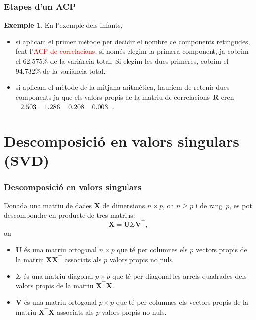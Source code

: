 \documentclass[12pt,t]{beamer}
\newcommand{\red}[1]{\textcolor{red}{#1}}
\renewcommand{\geq}{\geqslant}
\theoremstyle{plain}
\theoremstyle{definition}
\newtheorem{exemple}{Exemple}
\begin{document}
\begin{frame}
\frametitle{Etapes d'un ACP}
\begin{exemple}
En l'exemple dels infants,
\begin{itemize}
\item si aplicam el primer mètode per decidir el nombre de components retingudes, fent l'\red{ACP de correlacions}, si només elegim la primera component, ja cobrim el $62.575\%$ de la variància total. Si elegim les dues primeres, cobrim el $94.732\%$ de la variància total.
\item si aplicam el mètode de la mitjana aritmètica, hauríem de retenir dues components ja que  els valors propis de la matriu de correlacions~$\mathbf{R}$ eren 
$
\begin{tabular}{rrrr}
  2.503 & 1.286 & 0.208 & 0.003 \\ 
  \end{tabular}$.
\end{itemize}
\end{exemple}
\end{frame}


\section{Descomposició en valors singulars (SVD)}
\begin{frame}
\frametitle{Descomposició en valors singulars}
Donada una matriu de dades $\mathbf{X}$ de dimensions $n\times p$, on $n\geq p$ i de rang~$p$, es pot descompondre en producte de tres matrius:
\[
\mathbf{X}=\mathbf{U}\Sigma\mathbf{V}^\top,
\]
on
\begin{itemize}
\item $\mathbf{U}$ és una matriu ortogonal $n\times p$ que té per columnes els $p$ vectors propis de la matriu $\mathbf{X}\mathbf{X}^\top$ associats als $p$ valors propis no nuls.
\item ${\Sigma}$ és una matriu diagonal $p\times p$ que té per diagonal les arrels quadrades dels valors propis de la matriu $\mathbf{X}^\top\mathbf{X}$.
\item $\mathbf{V}$ és una matriu ortogonal $p\times p$ que té per columnes els vectors propis de la matriu $\mathbf{X}^\top\mathbf{X}$ associats als $p$ valors propis no nuls.
\end{itemize}
\end{frame}
\end{document}
